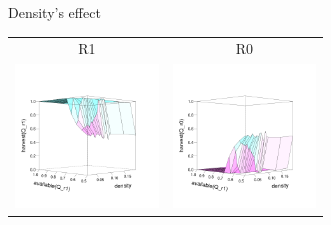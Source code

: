 \documentclass[8pt, handout=show,notes=show]{beamer}
\begin{document}
\begin{frame}{Density's effect}
	\renewcommand{\imgSize}{3.8cm}

	\begin{table}[H]
		\centering
		\begin{tabular}{cc}
			R1 & R0\\
			\includegraphics[width=\imgSize]{images/R1_median}&\includegraphics[width=\imgSize]{images/R0_median}\\

\end{tabular}
\end{table}
\end{frame}
\end{document}
